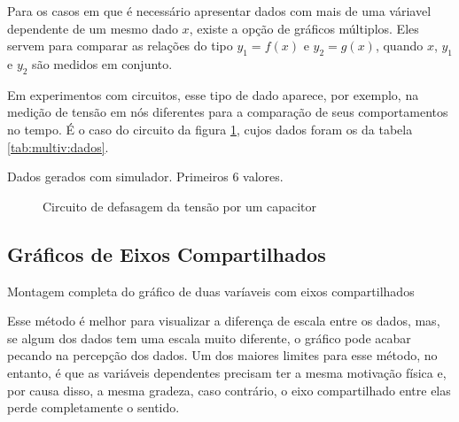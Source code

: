 \edef\indentacao{\the\parindent}

\noindent
\begin{minipage}[t]{0.55\textwidth}\setlength{\parindent}{\indentacao}

    Para os casos em que é necessário apresentar dados com mais de uma váriavel dependente de um mesmo dado $x$, existe a opção de gráficos múltiplos. Eles servem para comparar as relações do tipo $y_1 = f(x)$ e $y_2 = g(x)$, quando $x$, $y_1$ e $y_2$ são medidos em conjunto.

    Em experimentos com circuitos, esse tipo de dado aparece, por exemplo, na medição de tensão em nós diferentes para a comparação de seus comportamentos no tempo. É o caso do circuito da figura \ref{fig:multiv:circuito}, cujos dados foram os da tabela \ref{tab:multiv:dados}.

    \begin{table}[H]
        \centering
        
        \caption{Dados gerados com simulador. Primeiros 6 valores.}
        \label{tab:multiv:dados}
    \end{table}

\end{minipage}\vspace{0.05\textwidth}%
\begin{minipage}[t]{0.4\textwidth}
    \begin{figure}[H]
        \centering
        

        \caption{Circuito de defasagem da tensão por um capacitor}
        \label{fig:multiv:circuito}
    \end{figure}
\end{minipage}


\subsection{Gráficos de Eixos Compartilhados} \label{sec:multiv:juntos}

    \begin{listing}[H]
        \caption{Montagem completa do gráfico de duas varíaveis com eixos compartilhados}
        \label{code:multiv:juntos}

    \end{listing}

    Esse método é melhor para visualizar a diferença de escala entre os dados, mas, se algum dos dados tem uma escala muito diferente, o gráfico pode acabar pecando na percepção dos dados. Um dos maiores limites para esse método, no entanto, é que as variáveis dependentes precisam ter a mesma motivação física e, por causa disso, a mesma gradeza, caso contrário, o eixo compartilhado entre elas perde completamente o sentido.

